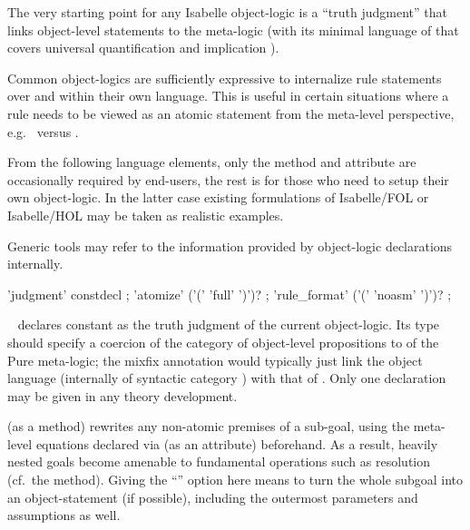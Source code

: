 \begin{isabellebody}
\begin{isamarkuptext}
  The very starting point for any Isabelle object-logic is a ``truth
  judgment'' that links object-level statements to the meta-logic
  (with its minimal language of  that covers universal
  quantification \isa{{\isasymAnd}} and implication \isa{{\isasymLongrightarrow}}).

  Common object-logics are sufficiently expressive to internalize rule
  statements over \isa{{\isasymAnd}} and \isa{{\isasymLongrightarrow}} within their own
  language.  This is useful in certain situations where a rule needs
  to be viewed as an atomic statement from the meta-level perspective,
  e.g.\  versus .

  From the following language elements, only the \mbox{}
  method and \mbox{} attribute are occasionally
  required by end-users, the rest is for those who need to setup their
  own object-logic.  In the latter case existing formulations of
  Isabelle/FOL or Isabelle/HOL may be taken as realistic examples.

  Generic tools may refer to the information provided by object-logic
  declarations internally.

  \begin{rail}
    'judgment' constdecl
    ;
    'atomize' ('(' 'full' ')')?
    ;
    'rule\_format' ('(' 'noasm' ')')?
    ;
  \end{rail}

  \begin{descr}
  
  \item [\mbox{\isa{\isacommand{judgment}}}~\isa{c\ {\isacharcolon}{\isacharcolon}\ {\isasymsigma}\ {\isacharparenleft}mx{\isacharparenright}}] declares
  constant  as the truth judgment of the current
  object-logic.  Its type \isa{{\isasymsigma}} should specify a coercion of the
  category of object-level propositions to  of the Pure
  meta-logic; the mixfix annotation  would typically
  just link the object language (internally of syntactic category
  ) with that of .  Only one \mbox{} declaration may be given in any theory development.
  
  \item [\mbox{\isa{atomize}} (as a method)] rewrites any non-atomic
  premises of a sub-goal, using the meta-level equations declared via
  \mbox{} (as an attribute) beforehand.  As a result,
  heavily nested goals become amenable to fundamental operations such
  as resolution (cf.\ the \mbox{} method).  Giving the ``'' option here means to turn the whole subgoal into an
  object-statement (if possible), including the outermost parameters
  and assumptions as well.


\end{descr}
\end{isamarkuptext}
\end{isabellebody}
